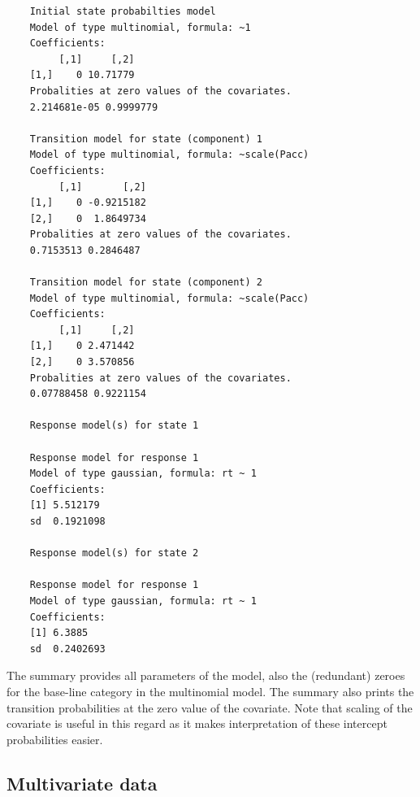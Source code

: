 \documentclass[article]{jss}
\begin{document}
\begin{verbatim}
	Initial state probabilties model 
	Model of type multinomial, formula: ~1
	Coefficients: 
		 [,1]     [,2]
	[1,]    0 10.71779
	Probalities at zero values of the covariates.
	2.214681e-05 0.9999779 

	Transition model for state (component) 1 
	Model of type multinomial, formula: ~scale(Pacc)
	Coefficients: 
		 [,1]       [,2]
	[1,]    0 -0.9215182
	[2,]    0  1.8649734
	Probalities at zero values of the covariates.
	0.7153513 0.2846487 

	Transition model for state (component) 2 
	Model of type multinomial, formula: ~scale(Pacc)
	Coefficients: 
		 [,1]     [,2]
	[1,]    0 2.471442
	[2,]    0 3.570856
	Probalities at zero values of the covariates.
	0.07788458 0.9221154 

	Response model(s) for state 1 

	Response model for response 1 
	Model of type gaussian, formula: rt ~ 1
	Coefficients: 
	[1] 5.512179
	sd  0.1921098 

	Response model(s) for state 2 

	Response model for response 1 
	Model of type gaussian, formula: rt ~ 1
	Coefficients: 
	[1] 6.3885
	sd  0.2402693 

\end{verbatim}

The summary provides all parameters of the model, also the 
(redundant) zeroes for the base-line category in the multinomial model. 
The summary also prints the transition probabilities at the zero value 
of the covariate. Note that scaling of the covariate is useful in this 
regard as it makes interpretation of these intercept probabilities 
easier. 

\subsection{Multivariate data}
\end{document}
